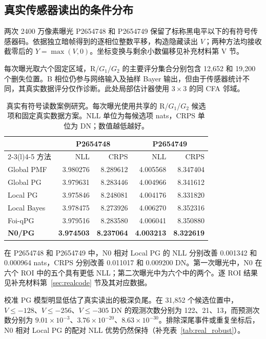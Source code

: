 \documentclass[10pt,twocolumn,journal]{IEEEtran}
\begin{document}
\subsection{真实传感器读出的条件分布}
两次 2400 万像素曝光 P2654748 和 P2654749 保留了标称黑电平以下的有符号传感器码。依据独立暗帧得到的逐相位整数平移，构造隐藏读出 $V$；两种方法均接收截零后的 $Y=\max(V,0)$。坐标变换与剩余小数偏移见补充材料第 V 节。

每次曝光取六个固定区域，R/$G_1$/$G_2$ 的主要评分集合分别包含 12,652 和 19,200 个删失位置。B 相位仍参与网络输入及抽样 Bayer 输出，但由于传感器统计不同，其真实数据评分仅作诊断。此处局部估计器使用 $3\times3$ 的同 CFA 邻域。

\begin{table}[t]
\centering\footnotesize
\setlength{\tabcolsep}{3pt}
\caption{真实有符号读数案例研究。每次曝光使用共享的 R/$G_1$/$G_2$ 候选项和固定真实数据方案。NLL 单位为每候选项 nats，CRPS 单位为 DN；数值越低越好。}
\label{tab:real}
\begin{tabular}{@{}lrrrr@{}}
\toprule
& \multicolumn{2}{c}{P2654748} & \multicolumn{2}{c}{P2654749}\\
\cmidrule(lr){2-3}\cmidrule(l){4-5}
方法 & NLL & CRPS & NLL & CRPS\\
\midrule
Global PMF & 3.980276 & 8.289612 & 4.005568 & 8.347404\\
Global PG & 3.979631 & 8.283446 & 4.004966 & 8.341612\\
Local PG & 3.975846 & 8.248081 & 4.004176 & 8.331820\\
Local Bayes & 3.978475 & 8.273926 & 4.006270 & 8.352316\\
Foi-qPG & 3.979516 & 8.283580 & 4.006041 & 8.350880\\
\textbf{N0/PG} & \textbf{3.974503} & \textbf{8.237064} & \textbf{4.003213} & \textbf{8.322619}\\
\bottomrule
\end{tabular}
\end{table}

在 P2654748 和 P2654749 中，N0 相对 Local PG 的 NLL 分别改善 0.001342 和 0.000964 nats，CRPS 分别改善 0.011017 和 0.009200 DN。第一次曝光中，N0 在六个 ROI 中的五个具有更低 NLL；第二次曝光中为六个中的两个。逐 ROI 结果见补充材料第~\ref{sec:realcode} 节及其对应数据。

校准 PG 模型明显低估了真实读出的极深负尾。在 31,852 个候选位置中，$V\leq-128$、$V\leq-256$、$V\leq-305$ DN 的观测次数分别为 122、21、13，而预测次数分别为 $9.01\times10^{-3}$、$3.76\times10^{-20}$、$8.63\times10^{-30}$。排除深尾事件或重复坐标后，N0 相对 Local PG 的配对 NLL 优势仍然保持（补充表~\ref{tab:real_robust}）。
\end{document}
